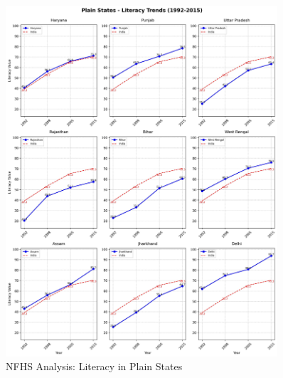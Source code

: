 \begin{figure}[H]
    \centering
    \includegraphics[width=0.9\textwidth]{figures/nfhs/plain_states_literacy_subplots.pdf}
    \caption{NFHS Analysis: Literacy in Plain States}
    \label{fig:nfhs_plain_literacy}
\end{figure}

